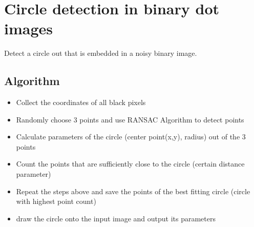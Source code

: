 \chapter{Circle detection in binary dot images}


Detect a circle out that is embedded in a noisy binary image.

\section{Algorithm}

\begin{itemize}
	\item Collect the coordinates of all black pixels
	\item Randomly choose 3 points and use RANSAC Algorithm to detect points
	\item Calculate parameters of the circle (center point(x,y), radius) out of the 3 points
	\item Count the points that are sufficiently close to the circle (certain distance parameter)
	\item Repeat the steps above and save the points of the best fitting circle (circle with highest point count)
	\item draw the circle onto the input image and output its parameters
\end{itemize}

